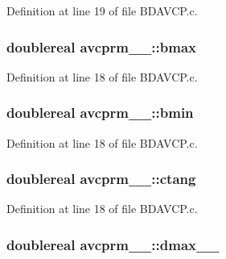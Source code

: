 Definition at line 19 of file B\+D\+A\+V\+C\+P.\+c.

\subsubsection[{\texorpdfstring{bmax}{bmax}}]{\setlength{\rightskip}{0pt plus 5cm}doublereal avcprm\+\_\+\_\+\+::bmax}\hypertarget{structavcprm__1___abc0a5e3d77e3b5aadd4f515a82ba660d}{}\label{structavcprm__1___abc0a5e3d77e3b5aadd4f515a82ba660d}


Definition at line 18 of file B\+D\+A\+V\+C\+P.\+c.

\subsubsection[{\texorpdfstring{bmin}{bmin}}]{\setlength{\rightskip}{0pt plus 5cm}doublereal avcprm\+\_\+\_\+\+::bmin}\hypertarget{structavcprm__1___a8cb8e2a1b34cb26a2abfbb00918fa9dc}{}\label{structavcprm__1___a8cb8e2a1b34cb26a2abfbb00918fa9dc}


Definition at line 18 of file B\+D\+A\+V\+C\+P.\+c.

\subsubsection[{\texorpdfstring{ctang}{ctang}}]{\setlength{\rightskip}{0pt plus 5cm}doublereal avcprm\+\_\+\_\+\+::ctang}\hypertarget{structavcprm__1___a11994c810fc103d5be32914c00129c95}{}\label{structavcprm__1___a11994c810fc103d5be32914c00129c95}


Definition at line 18 of file B\+D\+A\+V\+C\+P.\+c.

\subsubsection[{\texorpdfstring{dmax\+\_\+\+\_\+}{dmax__}}]{\setlength{\rightskip}{0pt plus 5cm}doublereal avcprm\+\_\+\_\+\+::dmax\+\_\+\+\_\+}\hypertarget{structavcprm__1___ac5d7e0e2050cc99b5aa55dd602359a6d}{}\label{structavcprm__1___ac5d7e0e2050cc99b5aa55dd602359a6d}


